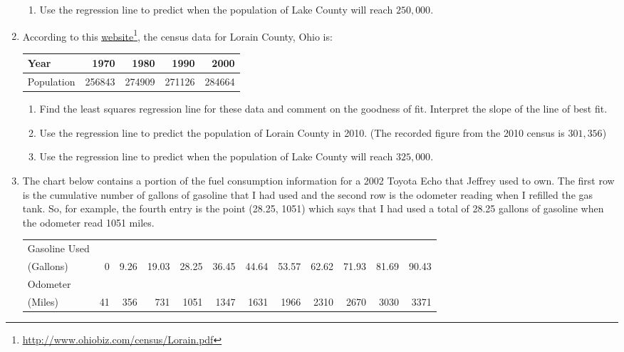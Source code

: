 \begin{enumerate}
\begin{enumerate}
\item  Use the regression line to predict when the population of Lake County will reach $250,\!000$.

\end{enumerate}


\item According to this \href{http://www.ohiobiz.com/census/Lorain.pdf}{\underline{website}}\footnote{\href{http://www.ohiobiz.com/census/Lorain.pdf}{\underline{http://www.ohiobiz.com/census/Lorain.pdf}}}, the census data for Lorain County, Ohio is:

\noindent \begin{tabular}{|l|r|r|r|r|} \hline
Year & 1970 & 1980 & 1990 & 2000 \\ 
\hline 
Population & 256843 & 274909 & 271126 & 284664 \\ \hline
\end{tabular}

\begin{enumerate}
 

\item  Find the least squares regression line for these data and comment on the goodness of fit. Interpret the slope of the line of best fit.

\item  Use the regression line to predict the population of Lorain County in 2010.  (The recorded figure from the 2010 census is $301,\!356$)

\item  Use the regression line to predict when the population of Lake County will reach $325,\!000$.

\end{enumerate}

\item The chart below contains a portion of the fuel consumption information for a 2002 Toyota Echo that Jeffrey used to own.  The first row is the cumulative number of gallons of gasoline that I had used and the second row is the odometer reading when I refilled the gas tank.  So, for example, the fourth entry is the point (28.25, 1051) which says that I had used a total of 28.25 gallons of gasoline when the odometer read 1051 miles.

\medskip



\noindent \begin{tabular}{|l|r|r|r|r|r|r|r|r|r|r|r|} \hline
Gasoline Used & & & & & & & & & & & \\
(Gallons)  & 0 & 9.26 & 19.03 & 28.25 & 36.45 & 44.64 & 53.57 & 62.62 & 71.93 & 81.69 & 90.43\\ 
\hline 
Odometer & & & & & & & & & & & \\
(Miles) & 41 & 356 & 731 & 1051 & 1347 & 1631 & 1966 & 2310 & 2670 & 3030 & 3371\\ \hline
\end{tabular}


\end{enumerate}
